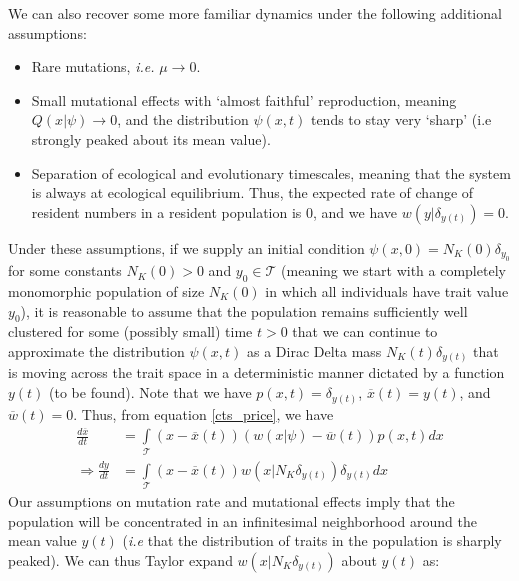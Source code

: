 We can also recover some more familiar dynamics under the following additional assumptions:
\begin{itemize}
    \item Rare mutations, \emph{i.e.} $\mu \to 0$.
    \item Small mutational effects with `almost faithful' reproduction, meaning $Q(x|\psi) \to 0$, and the distribution $\psi(x,t)$ tends to stay very `sharp' (i.e strongly peaked about its mean value). 
    \item Separation of ecological and evolutionary timescales, meaning that the system is always at ecological equilibrium. Thus, the expected rate of change of resident numbers in a resident population is $0$, and we have $w(y|\delta_{y(t)}) = 0$.
\end{itemize}
Under these assumptions, if we supply an initial condition $\psi(x,0) = N_{K}(0)\delta_{y_0}$ for some constants $N_K(0) > 0$ and $y_0 \in \mathcal{T}$ (meaning we start with a completely monomorphic population of size $N_K(0)$ in which all individuals have trait value $y_0$), it is reasonable to assume that the population remains sufficiently well clustered for some (possibly small) time $t>0$ that we can continue to approximate the distribution $\psi(x,t)$ as a Dirac Delta mass $N_{K}(t)\delta_{y(t)}$ that is moving across the trait space in a deterministic manner dictated by a function $y(t)$ (to be found). Note that we have $p(x,t) = \delta_{y(t)}$, $\overline{x}(t) = y(t)$, and $\overline{w}(t) = 0$. Thus, from equation \eqref{cts_price}, we have
\begin{align}
    \frac{d\overline{x}}{dt} &= \int\limits_{\mathcal{T}}(x-\overline{x}(t))(w(x|\psi)-\overline{w}(t))p(x,t)dx\nonumber\\
    \Rightarrow \frac{dy}{dt} &= \int\limits_{\mathcal{T}}(x-\overline{x}(t))w\left(x|N_K\delta_{y(t)}\right)\delta_{y(t)}dx\label{intermediate_for_canonical_AD}
\end{align}
Our assumptions on mutation rate and mutational effects imply that the population will be concentrated in an infinitesimal neighborhood around the mean value $y(t)$ (\emph{i.e} that the distribution of traits in the population is sharply peaked). We can thus Taylor expand $w\left(x|N_K\delta_{y(t)}\right)$ about $y(t)$ as:
